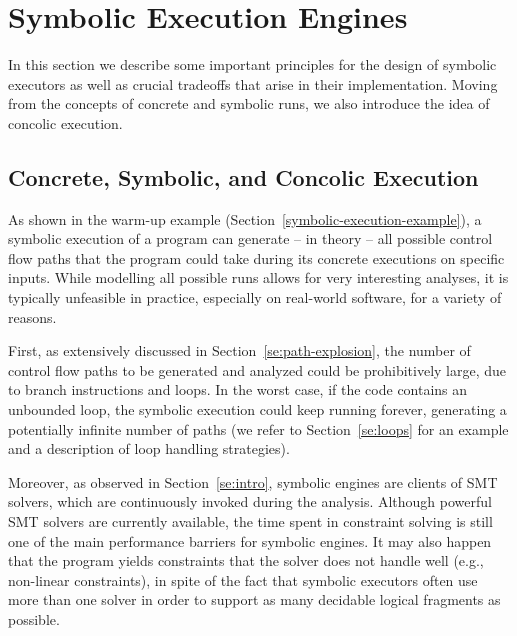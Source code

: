 
\section{Symbolic Execution Engines}
\label{se:executors}

In this section we describe some important principles for the design of symbolic executors as well as crucial tradeoffs that arise in their implementation. Moving from the concepts of concrete and symbolic runs, we also introduce the idea of concolic execution.

\subsection{Concrete, Symbolic, and Concolic Execution}
\label{ss:concrete-concolic-symbolic}

As shown in the warm-up example (Section~\ref{symbolic-execution-example}), a symbolic execution of a program can generate -- in theory -- all possible control flow paths that the program could take during its concrete executions on specific inputs. While modelling all possible runs allows for very interesting analyses, it is typically unfeasible in practice, especially on real-world software, for a variety of reasons.

First, as extensively discussed in Section~\ref{se:path-explosion}, the number of control flow paths to be generated and analyzed could be prohibitively large, due to branch instructions and loops. In the worst case, if the code contains an unbounded loop, the symbolic execution could keep running forever, generating a potentially infinite number of paths (we refer to Section~\ref{se:loops} for an example and a description of loop handling strategies).

Moreover, as observed in Section~\ref{se:intro}, symbolic engines are clients of SMT solvers, which are continuously invoked during the analysis. Although powerful SMT solvers are currently available, the time spent in constraint solving is still one of the main performance barriers for symbolic engines. It may also happen that the program yields constraints that the solver does not handle well (e.g., non-linear constraints), in spite of the fact that symbolic executors often use more than one solver in order to support as many decidable logical fragments as possible.
 
